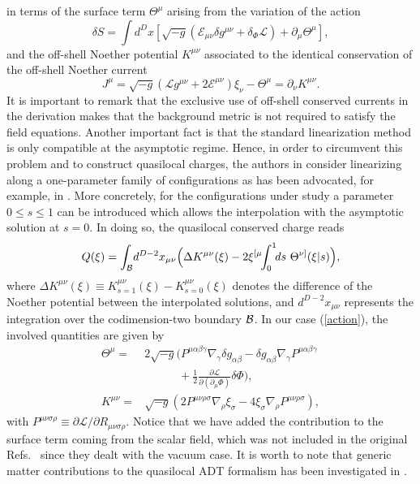 \documentclass[prd,twocolumn,superscriptaddress,amsmath,amssymb,nofootinbib]{revtex4-1}
\begin{document}
in terms of the surface term $\Theta^{\mu}$ arising from the
variation of the action
$$
\delta{S}={\int}d^Dx[\sqrt{-g}(\mathcal{E}_{\mu\nu}{\delta}g^{\mu\nu}
+\delta_\Phi\mathcal{L})+\partial_\mu\Theta^{\mu}],
$$
and the off-shell Noether potential $K^{\mu\nu}$ associated to
the identical conservation of the off-shell Noether current
$$
J^\mu=\sqrt{-g}(\mathcal{L}g^{\mu\nu}+2\mathcal{E}^{\mu\nu})\xi_\nu
-\Theta^{\mu}=\partial_{\nu}K^{\mu\nu}.
$$
It is important to remark that the exclusive use of off-shell
conserved currents in the derivation makes that the background
metric is not required to satisfy the field equations. Another
important fact is that the standard linearization method is
only compatible at the asymptotic regime. Hence, in order to
circumvent this problem and to construct quasilocal charges,
the authors in \cite{Kim:2013zha,Gim:2014nba} consider
linearizing along a one-parameter family of configurations as
has been advocated, for example, in \cite{Wald:1999wa}. More
concretely, for the configurations under study a parameter
$0\le{s}\le1$ can be introduced which allows the interpolation
with the asymptotic solution at $s=0$. In doing so, the
quasilocal conserved charge reads
\begin{equation}\label{eq:5}
Q(\xi)=\int_{\cal B}\!d^{D-2}x_{\mu\nu}
\Big(\Delta{K}^{\mu\nu}(\xi)-2\xi^{[\mu}\!\!
\int^1_0\!\!ds~\Theta^{\nu]}(\xi|s)\Big),
\end{equation}
where $\Delta{K}^{\mu\nu}(\xi)\equiv
{K}^{\mu\nu}_{s=1}(\xi)-K^{\mu\nu}_{s=0}(\xi)$ denotes the
difference of the Noether potential between the interpolated
solutions, and $d^{D-2}x_{\mu\nu}$ represents the integration
over the codimension-two boundary ${\cal B}$. In our case
(\ref{action}), the involved quantities are given by
\begin{align}
\Theta^\mu={}&2\sqrt{-g}\biggl(P^{\mu\alpha
\beta\gamma}\nabla_\gamma\delta g_{\alpha\beta}
-\delta g_{\alpha\beta}\nabla_\gamma P^{\mu\alpha\beta\gamma}\nonumber\\
&\qquad\quad
+\frac{1}{2}
\frac{\partial\mathcal{L}}{\partial\left(\partial_{\mu}\Phi\right)}
\delta\Phi\biggr), \label{eq:theta}\\
K^{\mu\nu}={}&\sqrt{-g}\left(2P^{\mu\nu\rho\sigma}\nabla_\rho\xi_\sigma
-4\xi_\sigma\nabla_\rho P^{\mu\nu\rho\sigma}\right) \label{eq:K},
\end{align}
with $P^{\mu\nu\sigma\rho}\equiv{\partial\mathcal{L}}/{\partial
{R}_{\mu\nu\sigma\rho}}$. Notice that we have added the
contribution to the surface term coming from the scalar field,
which was not included in the original
Refs.~\cite{Kim:2013zha,Gim:2014nba} since they dealt with the
vacuum case. It is worth to note that generic matter contributions to the quasilocal ADT formalism has been investigated in \cite{Hyun:2014nma}.
\end{document}
